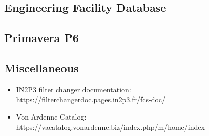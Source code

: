 \subsection{Engineering Facility Database}

\subsection{Primavera P6}

\subsection{Miscellaneous}
\begin{itemize}
	\item IN2P3 filter changer documentation: https://filterchangerdoc.pages.in2p3.fr/fcs-doc/
	\item Von Ardenne Catalog: https://vacatalog.vonardenne.biz/index.php/m/home/index
\end{itemize}








